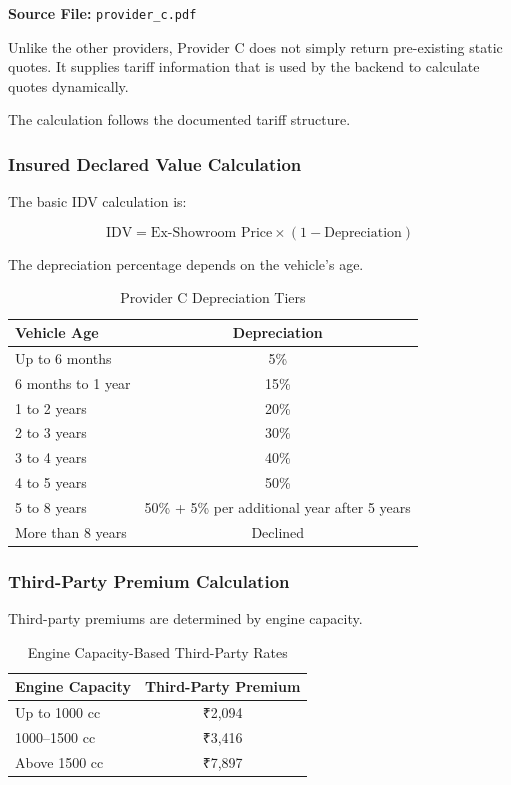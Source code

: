 \documentclass[11pt,a4paper]{article}
\begin{document}
\textbf{Source File:} \texttt{provider\_c.pdf}

Unlike the other providers, Provider C does not simply return
pre-existing static quotes. It supplies tariff information that
is used by the backend to calculate quotes dynamically.

The calculation follows the documented tariff structure.

\subsubsection{Insured Declared Value Calculation}

The basic IDV calculation is:

\[
\boxed{
\text{IDV}
=
\text{Ex-Showroom Price}
\times
(1-\text{Depreciation})
}
\]

The depreciation percentage depends on the vehicle's age.

\begin{table}[H]
\centering
\caption{Provider C Depreciation Tiers}
\begin{tabular}{@{}lc@{}}
\toprule
\textbf{Vehicle Age} & \textbf{Depreciation} \\
\midrule
Up to 6 months & 5\% \\
6 months to 1 year & 15\% \\
1 to 2 years & 20\% \\
2 to 3 years & 30\% \\
3 to 4 years & 40\% \\
4 to 5 years & 50\% \\
5 to 8 years & 50\% + 5\% per additional year after 5 years \\
More than 8 years & Declined \\
\bottomrule
\end{tabular}
\end{table}

\subsubsection{Third-Party Premium Calculation}

Third-party premiums are determined by engine capacity.

\begin{table}[H]
\centering
\caption{Engine Capacity-Based Third-Party Rates}
\begin{tabular}{@{}lc@{}}
\toprule
\textbf{Engine Capacity} & \textbf{Third-Party Premium} \\
\midrule
Up to 1000 cc & ₹2,094 \\
1000--1500 cc & ₹3,416 \\
Above 1500 cc & ₹7,897 \\
\bottomrule
\end{tabular}
\end{table}
\end{document}
